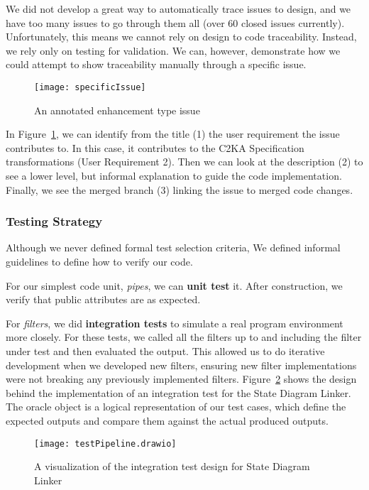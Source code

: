 We did not develop a great way to automatically trace issues to design,
and we have too many issues to go through them all (over 60 closed issues currently).
Unfortunately, this means we cannot rely on design to code traceability.
Instead, we rely only on testing for validation.
We can, however, demonstrate how we could attempt to show traceability manually through a specific issue.
\begin{figure}[ht]
    \centering
    \texttt{[image: specificIssue]}
    \caption{An annotated enhancement type issue}
    \label{fig:specificIssue}
\end{figure}
In Figure~\ref{fig:specificIssue}, we can identify from the title (1) the user requirement the issue contributes to.
In this case, it contributes to the C2KA Specification transformations (User Requirement 2).
Then we can look at the description (2) to see a lower level, but informal explanation to guide the code implementation.
Finally, we see the merged branch (3) linking the issue to merged code changes.

\newpage
\subsubsection{Testing Strategy}\label{subsubsec:tests-strat}
Although we never defined formal test selection criteria,
We defined informal guidelines to define how to verify our code.

For our simplest code unit, \textit{pipes}, we can \textbf{unit test} it.
After construction, we verify that public attributes are as expected.

For \textit{filters}, we did \textbf{integration tests} to simulate a real program environment more closely.
For these tests, we called all the filters up to and including the filter under test and then evaluated the output.
This allowed us to do iterative development when we developed new filters,
ensuring new filter implementations were not breaking any previously implemented filters.
Figure~\ref{fig:testShowcase} shows the design behind the implementation of an integration test for the State Diagram Linker.
The oracle object is a logical representation of our test cases, which define the expected outputs and compare them against the actual produced outputs.
\begin{figure}[ht]
    \centering
    \texttt{[image: testPipeline.drawio]}
    \caption{A visualization of the integration test design for State Diagram Linker}
    \label{fig:testShowcase}
\end{figure}

